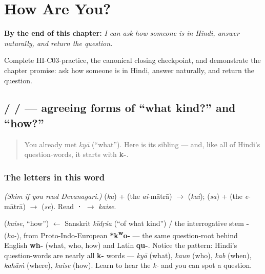
\chapter{How Are You?}
\label{ch:responding}

\begin{chapteropening}
\textbf{By the end of this chapter:} \emph{I can ask how someone is in Hindi, answer naturally, and return the question.}

Complete HI-C03-practice, the canonical closing checkpoint, and demonstrate the chapter promise: ask how someone is in Hindi, answer naturally, and return the question.
\end{chapteropening}

\section[\texorpdfstring{\hi{कैसा} / \hi{कैसी} / \hi{कैसे} (kaisā / kaisī / kaise)}{कैसा / कैसी / कैसे (kaisā / kaisī / kaise)}]{ /  /  — agreeing forms of \textquotedblleft{}what kind?\textquotedblright{} and \textquotedblleft{}how?\textquotedblright{}}

\label{lesson:HI-C03-kaise}



\begin{quote}
You already met \emph{kyā} (\textquotedblleft{}what\textquotedblright{}). Here is its sibling — and, like all of Hindi's question-words, it starts with \textbf{k-}.
\end{quote}

\subsection*{The letters in this word}
\emph{(Skim if you read Devanagari.)} \textbf{} (\emph{ka}) + \textbf{} (the \emph{ai}-mātrā) $\to$ \textbf{} (\emph{kai}); \textbf{} (\emph{sa}) + \textbf{} (the \emph{e}-mātrā) $\to$ \textbf{} (\emph{se}). Read \textbf{·} $\to$ \emph{kaise}.

\begin{cousinweb}
\textbf{} (\emph{kaise}, \textquotedblleft{}how\textquotedblright{}) $\leftarrow$ Sanskrit \emph{kīdṛśa} (\textquotedblleft{}of what kind\textquotedblright{}) / the interrogative stem \textbf{-} (\emph{ka-}), from Proto-Indo-European \textbf{*k\textsuperscript{w}o-} — the same question-root behind English \textbf{wh-} (what, who, how) and Latin \textbf{qu-}. Notice the pattern: Hindi's question-words are nearly all \textbf{k-} words — \emph{kyā} (what), \emph{kaun} (who), \emph{kab} (when), \emph{kahāṁ} (where), \emph{kaise} (how). Learn to hear the \emph{k-} and you can spot a question.
\end{cousinweb}

